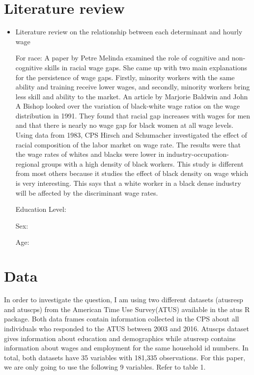 \documentclass{article}
\begin{document}
\section{Literature review}
\begin{itemize}
\item Literature review on the relationship between each determinant and hourly wage

For race:
A paper by Petre Melinda examined the role of cognitive and non-cognitive skills in racial wage gaps. She came up with two main explanations for the persistence of wage gaps. Firstly, minority workers with the same ability and training receive lower wages, and secondly, minority workers bring less skill and ability to the market.\cite{petre2019}
An article by Marjorie Baldwin and John A Bishop looked over the variation of black-white wage ratios on the wage distribution in 1991. They found that racial gap increases with wages for men and that there is nearly no wage gap for black women at all wage levels. \cite{baldwin1991}
Using data from 1983, CPS Hirsch and Schumacher investigated the effect of racial composition of the labor market on wage rate. The results were that the wage rates of whites and blacks were lower in industry-occupation-regional groups with a high density of black workers. This study is different from most others because it studies the effect of black density on wage which is very interesting. This says that a white worker in a black dense industry will be affected by the discriminant wage rates.\cite{hirsch1992}

Education Level:

Sex:

Age:

\end{itemize}

\section{Data}
In order to investigate the question, I am using two different datasets (atusresp and atuscps) from the American Time Use Survey(ATUS) available in the atus R package. Both data frames contain information collected in the CPS about all individuals who responded to the ATUS between 2003 and 2016. Atuscps dataset gives information about education and demographics while atusresp contains information about wages and employment for the same household id numbers. In total, both datasets have 35 variables with  181,335 observations. For this paper, we are only going to use the following 9 variables. Refer to table 1.
\end{document}
